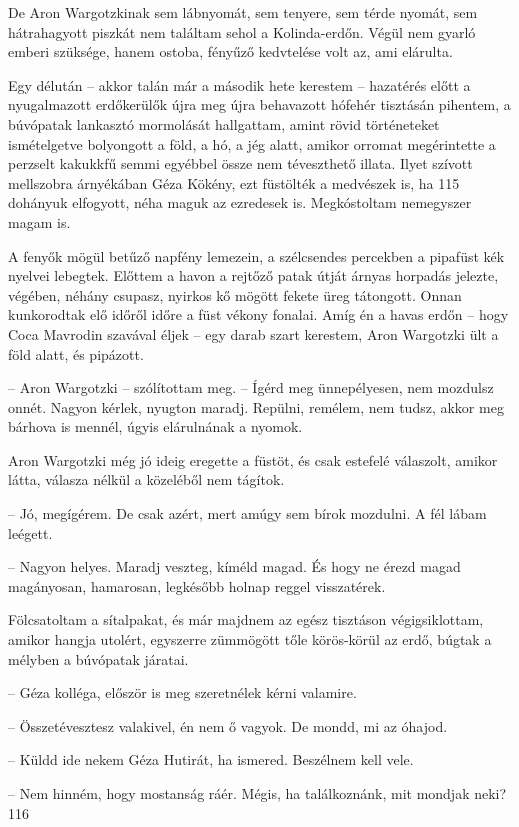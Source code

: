 \documentclass{IEEEtran}
\begin{document}
De Aron Wargotzkinak sem lábnyomát, sem tenyere, sem térde nyomát, sem
hátrahagyott piszkát nem találtam sehol a Kolinda-erdőn. Végül nem gyarló
emberi szüksége, hanem ostoba, fényűző kedvtelése volt az, ami elárulta.

Egy délután – akkor talán már a második hete kerestem – hazatérés előtt a
nyugalmazott erdőkerülők újra meg újra behavazott hófehér tisztásán pihentem,
a búvópatak lankasztó mormolását hallgattam, amint rövid történeteket
ismételgetve bolyongott a föld, a hó, a jég alatt, amikor orromat megérintette
a perzselt kakukkfű semmi egyébbel össze nem téveszthető illata. Ilyet szívott
mellszobra árnyékában Géza Kökény, ezt füstölték a medvészek is, ha
115 dohányuk elfogyott, néha maguk az ezredesek is. Megkóstoltam nemegyszer
magam is.

A fenyők mögül betűző napfény lemezein, a szélcsendes percekben a pipafüst kék
nyelvei lebegtek. Előttem a havon a rejtőző patak útját árnyas horpadás
jelezte, végében, néhány csupasz, nyirkos kő mögött fekete üreg tátongott.
Onnan kunkorodtak elő időről időre a füst vékony fonalai. Amíg én a havas
erdőn – hogy Coca Mavrodin szavával éljek – egy darab szart kerestem, Aron
Wargotzki ült a föld alatt, és pipázott.

– Aron Wargotzki – szólítottam meg. – Ígérd meg ünnepélyesen, nem mozdulsz
onnét. Nagyon kérlek, nyugton maradj. Repülni, remélem, nem tudsz, akkor meg
bárhova is mennél, úgyis elárulnának a nyomok.

Aron Wargotzki még jó ideig eregette a füstöt, és csak estefelé válaszolt,
amikor látta, válasza nélkül a közeléből nem tágítok.

– Jó, megígérem. De csak azért, mert amúgy sem bírok mozdulni. A fél lábam
leégett.

– Nagyon helyes. Maradj veszteg, kíméld magad. És hogy ne érezd magad
magányosan, hamarosan, legkésőbb holnap reggel visszatérek.

Fölcsatoltam a sítalpakat, és már majdnem az egész tisztáson végigsiklottam,
amikor hangja utolért, egyszerre zümmögött tőle körös-körül az erdő, búgtak a
mélyben a búvópatak járatai.

– Géza kolléga, először is meg szeretnélek kérni valamire.

– Összetévesztesz valakivel, én nem ő vagyok. De mondd, mi az óhajod.

– Küldd ide nekem Géza Hutirát, ha ismered. Beszélnem kell vele.

– Nem hinném, hogy mostanság ráér. Mégis, ha találkoznánk, mit mondjak neki?
116
\end{document}
